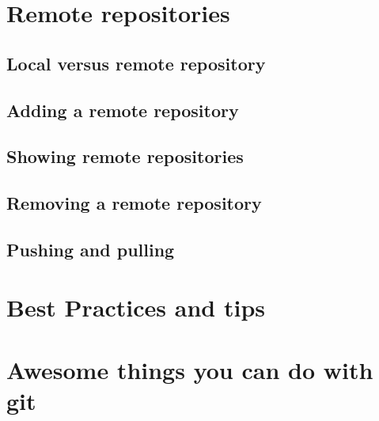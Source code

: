 \documentclass[10pt,a4paper]{beamer}
\begin{document}
\section{Remote repositories}

\subsection{Local versus remote repository}
\begin{frame}

\end{frame}

\subsection{Adding a remote repository}
\begin{frame}

\end{frame}

\subsection{Showing remote repositories}
\begin{frame}

\end{frame}

\subsection{Removing a remote repository}
\begin{frame}

\end{frame}

\subsection{Pushing and pulling}
\begin{frame}

\end{frame}


\section{Best Practices and tips}
\begin{frame}

\end{frame}


\section{Awesome things you can do with git}
\end{document}
